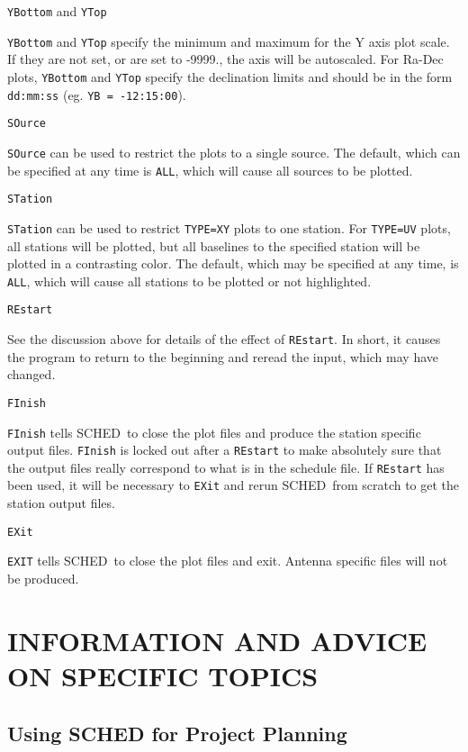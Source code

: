 \documentclass{report}
\newcommand{\schedb}{{\sc SCHED~}}
\begin{document}
{\tt YBottom} and {\tt YTop}

{\tt YBottom} and {\tt YTop} specify the minimum and maximum for the Y
axis plot scale.  If they are not set, or are set to -9999., the axis will
be autoscaled.  For Ra-Dec plots, {\tt YBottom} and {\tt YTop} specify
the declination limits and should be in the form {\tt dd:mm:ss} (eg.
{\tt YB = -12:15:00}).

{\tt SOurce}

{\tt SOurce} can be used to restrict the plots to a single source.  The
default, which can be specified at any time is {\tt ALL}, which will
cause all sources to be plotted.

{\tt STation}

{\tt STation} can be used to restrict {\tt TYPE=XY} plots to one station.
For {\tt TYPE=UV} plots, all stations will be plotted, but all baselines
to the specified station will be plotted in a contrasting color.
The default, which may be specified at any time, is {\tt ALL}, which
will cause all stations to be plotted or not highlighted.

{\tt REstart}

See the discussion above for details of the effect of {\tt REstart}.  In
short, it causes the program to return to the beginning and reread the
input, which may have changed.

{\tt FInish}

{\tt FInish} tells \schedb to close the plot files and produce the
station specific output files.  {\tt FInish} is locked out after a
{\tt REstart} to make absolutely sure that the output files really
correspond to what is in the schedule file.  If {\tt REstart} has
been used, it will be necessary to {\tt EXit} and rerun \schedb from
scratch to get the station output files.

{\tt EXit}

{\tt EXIT} tells \schedb to close the plot files and exit.  Antenna
specific files will not be produced.


\chapter{\label{CHP:ADVICE}INFORMATION AND ADVICE ON SPECIFIC TOPICS}

\section{\label{SEC:PLANNING}Using SCHED for Project Planning}
\end{document}
